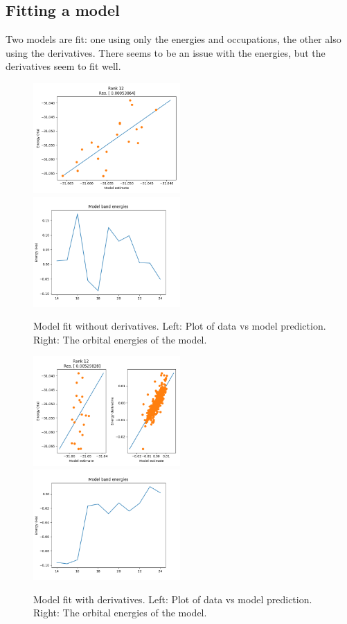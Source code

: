 \subsection{Fitting a model}

Two models are fit: one using only the energies and occupations, the other also using the derivatives.
There seems to be an issue with the energies, but the derivatives seem to fit well.

\begin{figure}[h!]
\includegraphics[width=0.5\textwidth]{images/vmc_lowen_model.png}
\includegraphics[width=0.5\textwidth]{images/vmc_lowen_model_bands.png}
\label{fig:model_fit_noderivs}
\caption{Model fit without derivatives. Left: Plot of data vs model prediction. Right: The orbital energies of the model.}
\end{figure}

\begin{figure}[h!]
\includegraphics[width=0.5\textwidth]{images/vmc_allderivs_lowen_model.png}
\includegraphics[width=0.5\textwidth]{images/vmc_allderivs_lowen_model_bands.png}
\label{fig:model_fit}
\caption{Model fit with derivatives. Left: Plot of data vs model prediction. Right: The orbital energies of the model.}
\end{figure}

  
  






